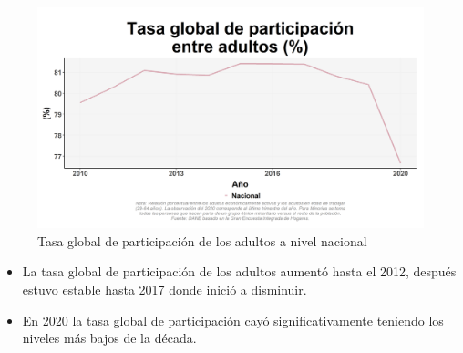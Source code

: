     \begin{figure}[H]
        \caption{Tasa global de participación de los adultos a nivel nacional \label{map_result_2} }
        \begin{center}
        \includegraphics[width=\textwidth,keepaspectratio]{img/var_83_trend.png}
        \end{center}
    \end{figure}
            \begin{itemize}
                \item La tasa global de participación de los adultos aumentó hasta el 2012, después estuvo estable hasta 2017 donde inició a disminuir.
                \item En 2020 la tasa global de participación cayó significativamente teniendo los niveles más bajos de la década.
                \end{itemize}


